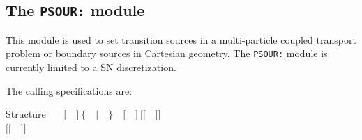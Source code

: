 \subsection{The {\tt PSOUR:} module}\label{sect:PSOURData}

This module is used to set transition sources in a multi-particle coupled transport problem or boundary sources in Cartesian geometry. The {\tt PSOUR:} module
is currently limited to a SN discretization.

\vskip 0.08cm

The calling specifications are:

\begin{DataStructure}{Structure }
~\moc{:=}~~$[$~~$]~\{$~~$|$~~$\}$~~$[$~~$]~[[$~~$]]$ \\
\hspace*{0.5cm}  $[[$~~$]]$ \moc{::}~ \\
\end{DataStructure}

